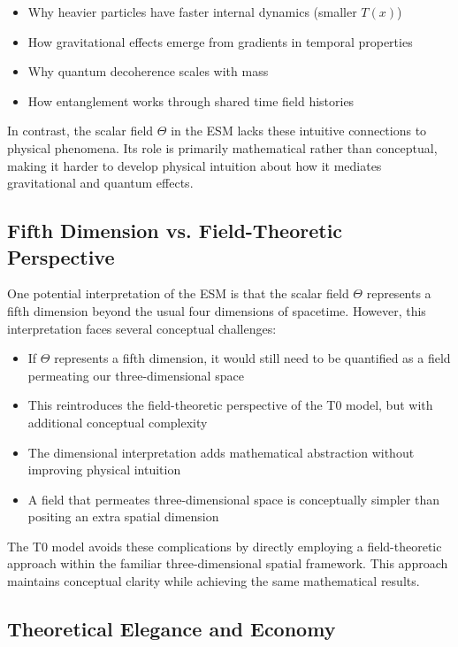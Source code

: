\documentclass[12pt,a4paper]{article}
\newcommand{\Tfield}{T(x)}
\begin{document}
	\begin{itemize}
		\item Why heavier particles have faster internal dynamics (smaller \(\Tfield\))
		\item How gravitational effects emerge from gradients in temporal properties
		\item Why quantum decoherence scales with mass
		\item How entanglement works through shared time field histories
	\end{itemize}
	
	In contrast, the scalar field \(\Theta\) in the ESM lacks these intuitive connections to physical phenomena. Its role is primarily mathematical rather than conceptual, making it harder to develop physical intuition about how it mediates gravitational and quantum effects.
	
	\subsection{Fifth Dimension vs. Field-Theoretic Perspective}
	\label{subsec:fifth_dimension_vs_field}
	
	One potential interpretation of the ESM is that the scalar field \(\Theta\) represents a fifth dimension beyond the usual four dimensions of spacetime. However, this interpretation faces several conceptual challenges:
	
	\begin{itemize}
		\item If \(\Theta\) represents a fifth dimension, it would still need to be quantified as a field permeating our three-dimensional space
		\item This reintroduces the field-theoretic perspective of the T0 model, but with additional conceptual complexity
		\item The dimensional interpretation adds mathematical abstraction without improving physical intuition
		\item A field that permeates three-dimensional space is conceptually simpler than positing an extra spatial dimension
	\end{itemize}
	
	The T0 model avoids these complications by directly employing a field-theoretic approach within the familiar three-dimensional spatial framework. This approach maintains conceptual clarity while achieving the same mathematical results.
	
	\subsection{Theoretical Elegance and Economy}
	\label{subsec:theoretical_elegance}
	
\end{document}
